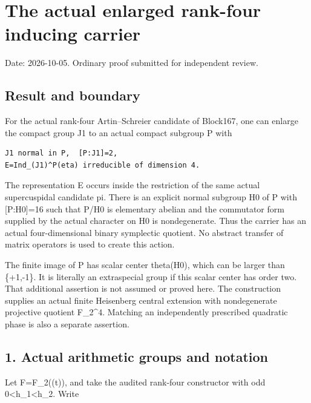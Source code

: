 \clearpage
\section{The actual enlarged rank-four inducing carrier}\label{app:rank4}

Date: 2026-10-05. Ordinary proof submitted for independent review.

\hypertarget{rank4-result-and-boundary}{%
\subsection{Result and boundary}\label{rank4-result-and-boundary}}

For the actual rank-four Artin--Schreier candidate of Block167, one can
enlarge the compact group J1 to an actual compact subgroup P with

\begin{Verbatim}[fontsize=\small,breaklines=true,breakanywhere=true]
J1 normal in P,  [P:J1]=2,
E=Ind_(J1)^P(eta) irreducible of dimension 4.
\end{Verbatim}

The representation E occurs inside the restriction of the same actual
supercuspidal candidate pi. There is an explicit normal subgroup H0 of P
with {[}P:H0{]}=16 such that P/H0 is elementary abelian and the
commutator form supplied by the actual character on H0 is nondegenerate.
Thus the carrier has an actual four-dimensional binary symplectic
quotient. No abstract transfer of matrix operators is used to create
this action.

The finite image of P has scalar center theta(H0), which can be larger
than \{+1,-1\}. It is literally an extraspecial group if this scalar
center has order two. That additional assertion is not assumed or proved
here. The construction supplies an actual finite Heisenberg central
extension with nondegenerate projective quotient F\_2\^{}4. Matching an
independently prescribed quadratic phase is also a separate assertion.

\hypertarget{rank4-actual-arithmetic-groups-and-notation}{%
\subsection{1. Actual arithmetic groups and
notation}\label{rank4-actual-arithmetic-groups-and-notation}}

Let F=F\_2((t)), and take the audited rank-four constructor with odd
0\textless h\_1\textless h\_2. Write

